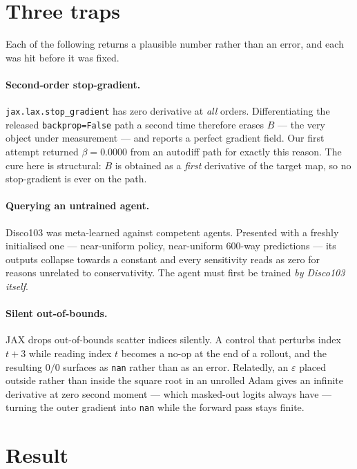 \documentclass[11pt]{article}
\theoremstyle{remark}
\begin{document}
\section{Three traps}\label{sec:traps}

Each of the following returns a plausible number rather than an error, and each
was hit before it was fixed.

\paragraph{Second-order stop-gradient.} \texttt{jax.lax.stop\_gradient} has zero
derivative at \emph{all} orders. Differentiating the released
\texttt{backprop=False} path a second time therefore erases $B$ --- the very
object under measurement --- and reports a perfect gradient field. Our first
attempt returned $\beta = 0.0000$ from an autodiff path for exactly this reason.
The cure here is structural: $B$ is obtained as a \emph{first} derivative of the
target map, so no stop-gradient is ever on the path.

\paragraph{Querying an untrained agent.} Disco103 was meta-learned against
competent agents. Presented with a freshly initialised one --- near-uniform
policy, near-uniform $600$-way predictions --- its outputs collapse towards a
constant and every sensitivity reads as zero for reasons unrelated to
conservativity. The agent must first be trained \emph{by Disco103 itself}.

\paragraph{Silent out-of-bounds.} JAX drops out-of-bounds scatter indices
silently. A control that perturbs index $t+3$ while reading index $t$ becomes a
no-op at the end of a rollout, and the resulting $0/0$ surfaces as \texttt{nan}
rather than as an error. Relatedly, an $\varepsilon$ placed outside rather than
inside the square root in an unrolled Adam gives an infinite derivative at zero
second moment --- which masked-out logits always have --- turning the outer
gradient into \texttt{nan} while the forward pass stays finite.

\section{Result}
\end{document}
